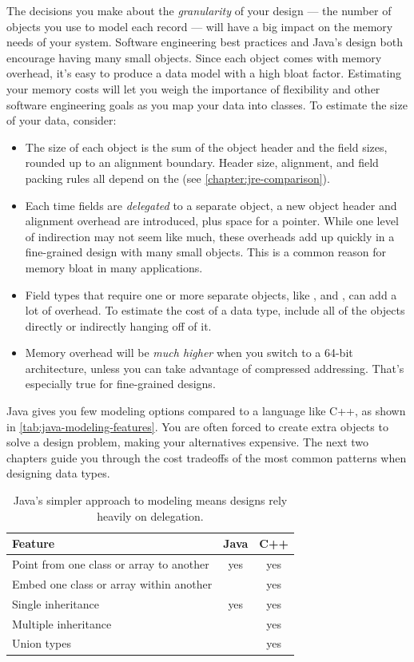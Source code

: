 The decisions you make about the \emph{granularity} of your design --- the
number of objects you use to model each record --- will have a big impact on
the memory needs of your system. 
Software engineering best practices and Java's design
both encourage having many small objects.
Since each object comes with memory overhead, it's easy to
produce a data model with a high bloat factor. Estimating your
memory costs will let you weigh the importance of
flexibility and other software engineering goals as you map your data into classes. To estimate the size of
your data, consider:
\begin{itemize}
  \item  The size of each object is the sum of the object header and the field
  sizes, rounded up to an alignment boundary. Header size, alignment, and field
  packing rules all depend on the \jre (see \autoref{chapter:jre-comparison}).
  \item Each time fields are \emph{delegated} to a separate object,
  a new object header and alignment overhead are introduced, plus
  space for a pointer. While one level of indirection may not seem like much,
  these overheads add up quickly in a fine-grained
  design with many small objects. This is a common reason for memory bloat in
  many applications.
  \item Field types that require one or more separate objects, like
  ,  and , can add a lot of
  overhead.
  To estimate the cost of a data type, include all of the objects directly
  or indirectly hanging off of it.
  \item Memory overhead will be \emph{much higher} when you switch to a 64-bit
  architecture, unless you can take advantage of compressed addressing. 
  That's especially true for fine-grained designs.
\end{itemize}

Java gives you few modeling options compared to a language
like C++, as shown in \autoref{tab:java-modeling-features}. You are often forced to create
extra objects to solve a design problem, making your alternatives expensive.
The next two chapters guide you through the cost tradeoffs of the most common
patterns when designing data types.

\begin{table}[h]
  \centering
\begin{tabular}{lcc} \toprule
	Feature & Java & C++ \\ \midrule
	Point from one class or array to another & yes & yes \\
	Embed one class or array within another & & yes \\
	Single inheritance & yes & yes \\
	Multiple inheritance &  & yes \\
	Union types & & yes \\
	\bottomrule
\end{tabular}
  \caption{Java's simpler approach to modeling means designs rely heavily on
  delegation.}
  \label{tab:java-modeling-features}
\end{table}


